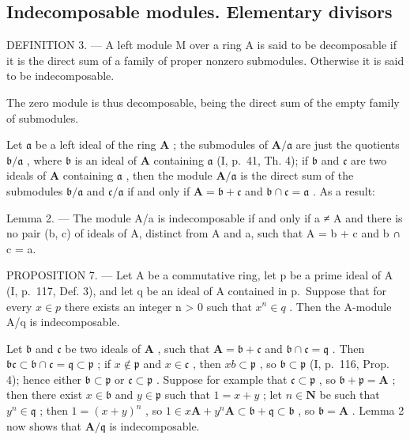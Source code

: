 \subsection{Indecomposable modules. Elementary divisors}

DEFINITION 3. --- A left module M over a ring A is said to be decomposable if it is the direct sum of a family of proper nonzero submodules. Otherwise it is said to be indecomposable.

The zero module is thus decomposable, being the direct sum of the empty family of submodules.

Let \(\mathfrak{a}\) be a left ideal of the ring \(\mathbf{A}\) ; the submodules of \(\mathbf{A} / \mathfrak{a}\) are just the quotients \(\mathfrak{b} / \mathfrak{a}\) , where \(\mathfrak{b}\) is an ideal of \(\mathbf{A}\) containing \(\mathfrak{a}\) (I, p.~41, Th. 4); if \(\mathfrak{b}\) and \(\mathfrak{c}\) are two ideals of \(\mathbf{A}\) containing \(\mathfrak{a}\) , then the module \(\mathbf{A} / \mathfrak{a}\) is the direct sum of the submodules \(\mathfrak{b} / \mathfrak{a}\) and \(\mathfrak{c} / \mathfrak{a}\) if and only if \(\mathbf{A} = \mathfrak{b} + \mathfrak{c}\) and \(\mathfrak{b} \cap \mathfrak{c} = \mathfrak{a}\) . As a result:

Lemma 2. --- The module A/a is indecomposable if and only if a ≠ A and there is no pair (b, c) of ideals of A, distinct from A and a, such that A = b + c and b ∩ c = a.

PROPOSITION 7. --- Let A be a commutative ring, let p be a prime ideal of A (I, p.~117, Def. 3), and let q be an ideal of A contained in p.~Suppose that for every \(x \in p\) there exists an integer n \textgreater{} 0 such that \(x^{n} \in q\) . Then the A-module A/q is indecomposable.

Let \(\mathfrak{b}\) and \(\mathfrak{c}\) be two ideals of \(\mathbf{A}\) , such that \(\mathbf{A} = \mathfrak{b} + \mathfrak{c}\) and \(\mathfrak{b} \cap \mathfrak{c} = \mathfrak{q}\) . Then \(\mathfrak{bc} \subset \mathfrak{b} \cap \mathfrak{c} = \mathfrak{q} \subset \mathfrak{p}\) ; if \(x \notin \mathfrak{p}\) and \(x \in \mathfrak{c}\) , then \(xb \subset \mathfrak{p}\) , so \(\mathfrak{b} \subset \mathfrak{p}\) (I, p.~116, Prop. 4); hence either \(\mathfrak{b} \subset \mathfrak{p}\) or \(\mathfrak{c} \subset \mathfrak{p}\) . Suppose for example that \(\mathfrak{c} \subset \mathfrak{p}\) , so \(\mathfrak{b} + \mathfrak{p} = \mathbf{A}\) ; then there exist \(x \in \mathfrak{b}\) and \(y \in \mathfrak{p}\) such that \(1 = x + y\) ; let \(n \in \mathbf{N}\) be such that \(y^n \in \mathfrak{q}\) ; then \(1 = (x + y)^n\) , so \(1 \in x\mathbf{A} + y^n\mathbf{A} \subset \mathfrak{b} + \mathfrak{q} \subset \mathfrak{b}\) , so \(\mathfrak{b} = \mathbf{A}\) . Lemma 2 now shows that \(\mathbf{A}/\mathfrak{q}\) is indecomposable.

